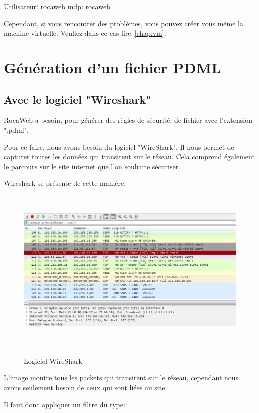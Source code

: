 \documentclass[a4paper,10pt,justified,openany]{tufte-book}
\begin{document}
Utilisateur: rocaweb
mdp: rocaweb


Cependant, si vous rencontrer des problèmes, vous pouvez créer vous même la machine virtuelle.
Veullez dans ce cas lire~\ref{chap:vm}. 





\chapter{Génération d'un fichier PDML}

\section{Avec le logiciel "Wireshark"}

RocaWeb a besoin, pour générer des règles de sécurité, de fichier avec l'extension ".pdml".  

Pour ce faire, nous avons besoin du logiciel "WireShark". 
Il nous permet de capturer toutes les données qui transitent sur le réseau. Cela comprend également le parcours sur le site internet que l'on souhaite sécuriser.

Wireshark se présente de cette manière:

\begin{figure}
\includegraphics[width=12cm, height=8cm]{./images/wireshark.PNG}
\label{vueapprentissage}
\caption{Logiciel WireShark}
\end{figure}


L'image montre tous les packets qui transitent sur le réseau, cependant nous avons seulement besoin  de ceux qui sont liées au site. 

Il faut donc appliquer un filtre du type: 
 
\end{document}
